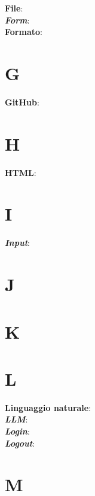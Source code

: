 \documentclass[5pt]{article}
\begin{document}
\textbf{File}: \\

\textbf{\textit{Form}}: \\

\textbf{Formato}: \\

\section*{G}

\textbf{GitHub}: \\

\section*{H}

\textbf{HTML}: \\

\section*{I}

\textbf{\textit{Input}}: \\

\section*{J}

\section*{K}

\section*{L}

\textbf{Linguaggio naturale}: \\

\textbf{\textit{LLM}}: \\

\textbf{\textit{Login}}: \\

\textbf{\textit{Logout}}: \\

\section*{M}
\end{document}
